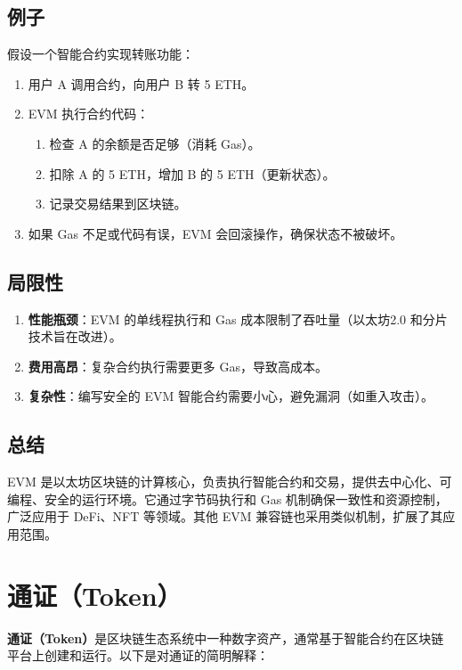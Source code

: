 \documentclass[12pt]{ctexart}
\begin{document}
\subsection{例子}
假设一个智能合约实现转账功能：
\begin{enumerate}
    \item 用户 A 调用合约，向用户 B 转 5 ETH。
    \item EVM 执行合约代码：
    \begin{enumerate}
        \item 检查 A 的余额是否足够（消耗 Gas）。
        \item 扣除 A 的 5 ETH，增加 B 的 5 ETH（更新状态）。
        \item 记录交易结果到区块链。
    \end{enumerate}
    \item 如果 Gas 不足或代码有误，EVM 会回滚操作，确保状态不被破坏。
\end{enumerate}

\subsection{局限性}
\begin{enumerate}
    \item \textbf{性能瓶颈}：EVM 的单线程执行和 Gas 成本限制了吞吐量（以太坊2.0 和分片技术旨在改进）。
    \item \textbf{费用高昂}：复杂合约执行需要更多 Gas，导致高成本。
    \item \textbf{复杂性}：编写安全的 EVM 智能合约需要小心，避免漏洞（如重入攻击）。
\end{enumerate}

\subsection{总结}
EVM 是以太坊区块链的计算核心，负责执行智能合约和交易，提供去中心化、可编程、安全的运行环境。它通过字节码执行和 Gas 机制确保一致性和资源控制，广泛应用于 DeFi、NFT 等领域。其他 EVM 兼容链也采用类似机制，扩展了其应用范围。

\section{通证（Token）}
\textbf{通证（Token）}是区块链生态系统中一种数字资产，通常基于智能合约在区块链平台上创建和运行。以下是对通证的简明解释：
\end{document}
